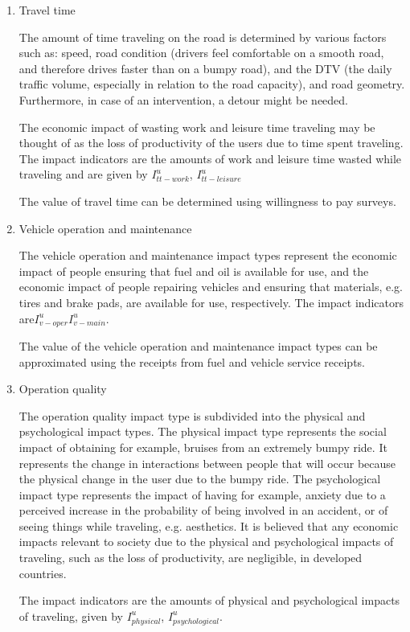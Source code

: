 \begin{enumerate}
\item Travel time

The amount of time traveling on the road is determined by various factors such as: speed, road condition (drivers feel comfortable on a smooth road, and therefore drives faster than on a bumpy road), and the DTV (the daily traffic volume, especially in relation to the road capacity), and road geometry. Furthermore, in case of an intervention, a detour might be needed.

The economic impact of wasting work and leisure time traveling may be thought of as the loss of productivity of the users due to time spent traveling. The impact indicators are the amounts of work and leisure time wasted while traveling and are given by $I_{tt - work}^u$, $I_{tt - leisure}^u$

The value of travel time can be determined using willingness to pay surveys. 

\item Vehicle operation and maintenance

The vehicle operation and maintenance impact types represent the economic impact of people ensuring that fuel and oil is available for use, and the economic impact of people repairing vehicles and ensuring that materials, e.g. tires and brake pads, are available for use, respectively. The impact indicators are$I_{v - oper}^u$$I_{v - main}^u$.

The value of the vehicle operation and maintenance impact types can be approximated using the receipts from fuel and vehicle service receipts.

\item Operation quality

The operation quality impact type is subdivided into the physical and psychological impact types. The physical impact type represents the social impact of obtaining for example, bruises from an extremely bumpy ride. It represents the change in interactions between people that will occur because the physical change in the user due to the bumpy ride. The psychological impact type represents the impact of having for example, anxiety due to a perceived increase in the probability of being involved in an accident, or of seeing things while traveling, e.g. aesthetics. It is believed that any economic impacts relevant to society due to the physical and psychological impacts of traveling, such as the loss of productivity, are negligible, in developed countries. 

The impact indicators are the amounts of physical and psychological impacts of traveling, given by $I_{physical}^u$, $I_{psychological}^u$. 


\end{enumerate}

